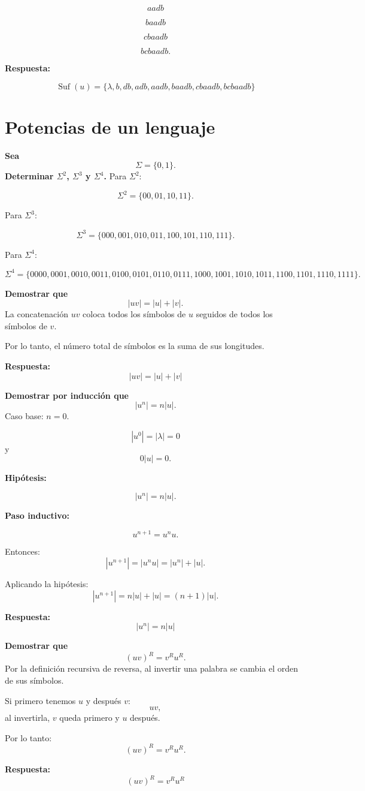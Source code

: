 \documentclass[12pt]{article}
\begin{document}
\[
aadb
\]

\[
baadb
\]

\[
cbaadb
\]

\[
bcbaadb.
\]

\textbf{Respuesta:}

\[
\boxed{
\operatorname{Suf}(u)=
\{\lambda,b,db,adb,aadb,baadb,cbaadb,bcbaadb\}
}
\]

\section{Potencias de un lenguaje}

\textbf{Sea
\[
\Sigma=\{0,1\}.
\]
Determinar $\Sigma^2$, $\Sigma^3$ y $\Sigma^4$.}
Para $\Sigma^2$:

\[
\Sigma^2=
\{00,01,10,11\}.
\]

Para $\Sigma^3$:

\[
\Sigma^3=
\{000,001,010,011,100,101,110,111\}.
\]

Para $\Sigma^4$:

\[
\Sigma^4=
\{
0000,0001,0010,0011,
0100,0101,0110,0111,
1000,1001,1010,1011,
1100,1101,1110,1111
\}.
\]

\textbf{Demostrar que
\[
|uv|=|u|+|v|.
\]}
La concatenación $uv$ coloca todos los símbolos de $u$ seguidos de
todos los símbolos de $v$.

Por lo tanto, el número total de símbolos es la suma de sus longitudes.

\textbf{Respuesta:}
\[
\boxed{|uv|=|u|+|v|}
\]

\textbf{Demostrar por inducción que
\[
|u^n|=n|u|.
\]}
Caso base: $n=0$.

\[
|u^0|=|\lambda|=0
\]
y
\[
0|u|=0.
\]

\textbf{Hipótesis:}

\[
|u^n|=n|u|.
\]

\textbf{Paso inductivo:}

\[
u^{n+1}=u^nu.
\]

Entonces:
\[
|u^{n+1}|
=
|u^nu|
=
|u^n|+|u|.
\]

Aplicando la hipótesis:
\[
|u^{n+1}|
=
n|u|+|u|
=
(n+1)|u|.
\]

\textbf{Respuesta:}
\[
\boxed{|u^n|=n|u|}
\]

\textbf{Demostrar que
\[
(uv)^R=v^Ru^R.
\]}
Por la definición recursiva de reversa, al invertir una palabra se cambia
el orden de sus símbolos.

Si primero tenemos $u$ y después $v$:
\[
uv,
\]
al invertirla, $v$ queda primero y $u$ después.

Por lo tanto:
\[
(uv)^R=v^Ru^R.
\]

\textbf{Respuesta:}
\[
\boxed{(uv)^R=v^Ru^R}
\]
\end{document}
